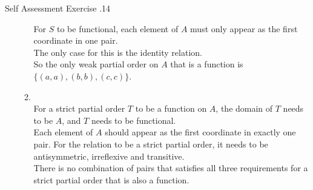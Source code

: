 \documentclass[../notes.tex]{subfiles}
\begin{document}
\begin{exercise}{Self Assessment Exercise \thechapter.14}
\begin{enumerate}
\begin{enumerate}[label=(\alph*)]
									For $S$ to be functional, each element of $A$ must only appear as the first coordinate in one pair.\\
									The only case for this is the identity relation.\\
									So the only weak partial order on $A$ that is a function is $\bigl\{(a, a), (b, b), (c, c)\bigr\}$.
								\item {}\\
									For a strict partial order $T$ to be a function on $A$, the domain of $T$ needs to be $A$, and $T$ needs to be functional.\\
									Each element of $A$ should appear as the first coordinate in exactly one pair. For the relation to be a strict partial order, it needs to be antisymmetric, irreflexive and transitive.\\
									There is no combination of pairs that satisfies all three requirements for a strict partial order that is also a function.
							\end{enumerate}
					\end{enumerate}
				\end{exercise}
\end{document}
